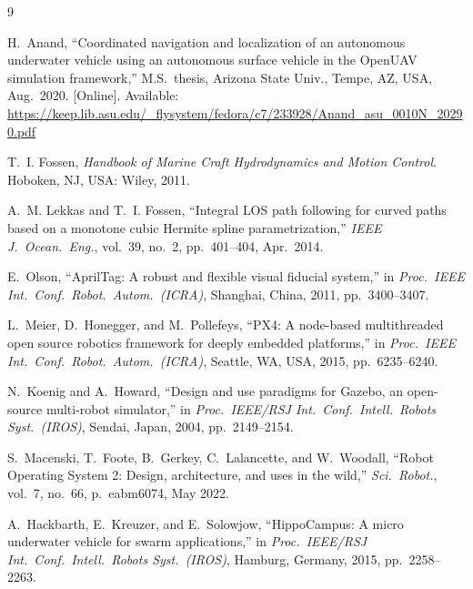 \documentclass[conference]{IEEEtran}
\begin{document}
\balance
\begin{thebibliography}{9}

H.~Anand, ``Coordinated navigation and localization of an autonomous underwater vehicle using an autonomous surface vehicle in the {OpenUAV} simulation framework,'' M.S.\ thesis, Arizona State Univ., Tempe, AZ, USA, Aug.\ 2020. [Online]. Available: \url{https://keep.lib.asu.edu/_flysystem/fedora/c7/233928/Anand_asu_0010N_20290.pdf}

T.~I. Fossen, \emph{Handbook of Marine Craft Hydrodynamics and Motion Control}. Hoboken, NJ, USA: Wiley, 2011.

A.~M. Lekkas and T.~I. Fossen, ``Integral {LOS} path following for curved paths based on a monotone cubic {Hermite} spline parametrization,'' \emph{IEEE J.\ Ocean.\ Eng.}, vol.~39, no.~2, pp.~401--404, Apr.\ 2014.

E.~Olson, ``{AprilTag}: A robust and flexible visual fiducial system,'' in \emph{Proc.\ IEEE Int.\ Conf.\ Robot.\ Autom.\ (ICRA)}, Shanghai, China, 2011, pp.~3400--3407.

L.~Meier, D.~Honegger, and M.~Pollefeys, ``{PX4}: A node-based multithreaded open source robotics framework for deeply embedded platforms,'' in \emph{Proc.\ IEEE Int.\ Conf.\ Robot.\ Autom.\ (ICRA)}, Seattle, WA, USA, 2015, pp.~6235--6240.

N.~Koenig and A.~Howard, ``Design and use paradigms for {Gazebo}, an open-source multi-robot simulator,'' in \emph{Proc.\ IEEE/RSJ Int.\ Conf.\ Intell.\ Robots Syst.\ (IROS)}, Sendai, Japan, 2004, pp.~2149--2154.

S.~Macenski, T.~Foote, B.~Gerkey, C.~Lalancette, and W.~Woodall, ``Robot {Operating System 2}: Design, architecture, and uses in the wild,'' \emph{Sci.\ Robot.}, vol.~7, no.~66, p.~eabm6074, May 2022.

A.~Hackbarth, E.~Kreuzer, and E.~Solowjow, ``{HippoCampus}: A micro underwater vehicle for swarm applications,'' in \emph{Proc.\ IEEE/RSJ Int.\ Conf.\ Intell.\ Robots Syst.\ (IROS)}, Hamburg, Germany, 2015, pp.~2258--2263.

\end{thebibliography}
\end{document}
